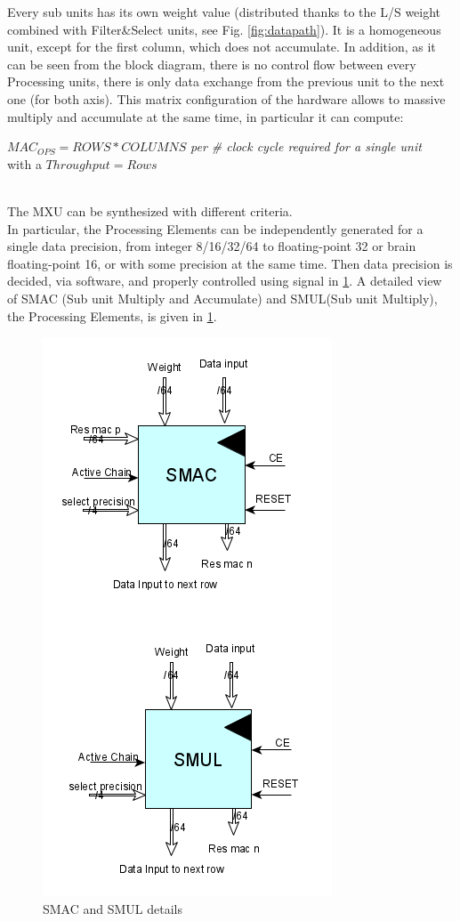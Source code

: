 Every sub units has its own weight value (distributed thanks to the L/S weight combined with Filter\&Select units, see Fig. \ref{fig:datapath}). It is a homogeneous unit, except for the first column, which does not accumulate. In addition, as it can be seen from the block diagram, there is no control flow between every Processing units, there is only data exchange from the previous unit to the next one (for both axis). This matrix configuration of the hardware allows to massive multiply and accumulate at the same time, in particular it can compute:\\
\begin{center}
$MAC_{OPS}= ROWS*COLUMNS $ \textit{per \# clock cycle required for a single unit}\\ with a $Throughput=Rows$
\end{center}
\ \\
The MXU can be synthesized with different criteria.\\ In particular, the Processing Elements can be independently generated for a single data precision, from integer 8/16/32/64 to floating-point 32 or brain floating-point 16, or with some precision at the same time. Then data precision is decided, via software, and properly controlled using signal in \ref{fig:smac}.
\newpage
A detailed view of SMAC (Sub unit Multiply and Accumulate) and SMUL(Sub unit Multiply), the Processing Elements, is given in \ref{fig:smac}.
\begin{figure}[H]
\centering
\captionsetup{justification=centering}
\includegraphics[scale=0.45,angle=0]{./figure/smac.png}
\caption{SMAC and SMUL details}
\label{fig:smac}
\end{figure} 

